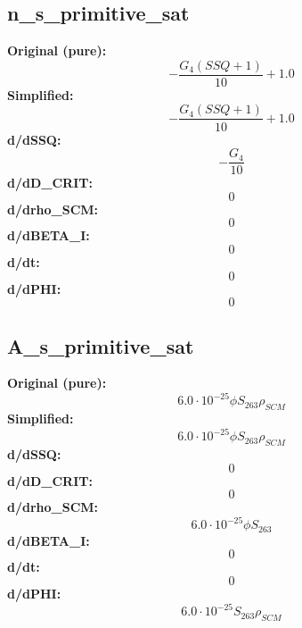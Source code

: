 \subsection{n_s_primitive_sat}
\textbf{Original (pure):}
\begin{equation}
- \frac{G_{4} \left(SSQ + 1\right)}{10} + 1.0
\end{equation}
\textbf{Simplified:}
\begin{equation}
- \frac{G_{4} \left(SSQ + 1\right)}{10} + 1.0
\end{equation}
\textbf{d/dSSQ:}
\begin{equation}
- \frac{G_{4}}{10}
\end{equation}
\textbf{d/dD_CRIT:}
\begin{equation}
0
\end{equation}
\textbf{d/drho_SCM:}
\begin{equation}
0
\end{equation}
\textbf{d/dBETA_I:}
\begin{equation}
0
\end{equation}
\textbf{d/dt:}
\begin{equation}
0
\end{equation}
\textbf{d/dPHI:}
\begin{equation}
0
\end{equation}

\subsection{A_s_primitive_sat}
\textbf{Original (pure):}
\begin{equation}
6.0 \cdot 10^{-25} \phi S_{26 3} \rho_{SCM}
\end{equation}
\textbf{Simplified:}
\begin{equation}
6.0 \cdot 10^{-25} \phi S_{26 3} \rho_{SCM}
\end{equation}
\textbf{d/dSSQ:}
\begin{equation}
0
\end{equation}
\textbf{d/dD_CRIT:}
\begin{equation}
0
\end{equation}
\textbf{d/drho_SCM:}
\begin{equation}
6.0 \cdot 10^{-25} \phi S_{26 3}
\end{equation}
\textbf{d/dBETA_I:}
\begin{equation}
0
\end{equation}
\textbf{d/dt:}
\begin{equation}
0
\end{equation}
\textbf{d/dPHI:}
\begin{equation}
6.0 \cdot 10^{-25} S_{26 3} \rho_{SCM}
\end{equation}

